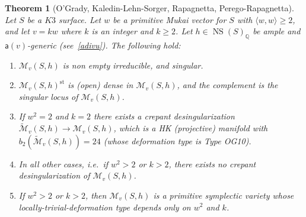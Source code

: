 \documentclass[11pt]{amsart}
\newcommand{\QQ}{{\mathbb Q}}
\let\mathcal\mathscr
\def\cM{\mathcal{M}}
\DeclareMathOperator{\NS}{NS}
\DeclareMathOperator{\st}{st}
\newcommand{\la}{\langle}
\newcommand{\ra}{\rangle}
\newcommand{\wt}{\widetilde}
\newtheorem{thm}[lmm]{Theorem}
\theoremstyle{definition}
\theoremstyle{remark}
\begin{document}
%
\begin{thm}[O'Grady, Kaledin-Lehn-Sorger, Rapagnetta, Perego-Rapagnetta]\label{thm:vettmuknonprim}
%
Let $S$ be a $K3$ surface. Let $w$ be a primitive 
Mukai vector for $S$ with $\la w,w\ra\ge 2$, and let $v=kw$ where $k$ is an integer and $k\ge 2$. Let $h\in\NS(S)_{\QQ}$ be ample and ${\mathsf a}(v)$-generic  (see~\eqref{adivu}). The following hold:
%
\begin{enumerate}
%
\item
%
$\cM_v(S,h)$ is non empty irreducible, and singular.
%
\item
%
$\cM_v(S,h)^{\st}$ is (open) dense in $\cM_v(S,h)$, and the complement is the singular locus of $\cM_v(S,h)$.
%
\item
%
 If $w^2=2$ and $k=2$ there exists a crepant desingularization $\wt{\cM}_v(S,h)\to \cM_v(S,h)$, which is a HK (projective) manifold with 
 $b_2(\wt{\cM}_v(S,h))=24$ (whose deformation type is \emph{Type OG10}).
%
\item
%
In all other cases, i.e.~if $w^2>2$ or $k>2$,  there exists no crepant desingularization of $\cM_v(S,h)$.
%
\item
%
If $w^2>2$ or $k>2$, then $\cM_v(S,h)$ is a primitive symplectic variety whose locally-trivial-deformation type depends only on 
$w^2$ and $k$.
%
\end{enumerate}
%
%
\end{thm}
%

%
\end{document}
